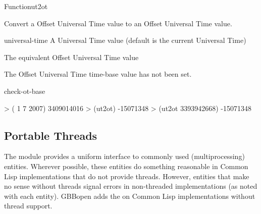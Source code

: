 \documentclass[10pt,twoside,english,pdftex]{article}
\begin{document}
\begin{functiondoc}{Function}{ut2ot}{ 
  \returns{} }
%

\fnsyntax

\fnpurpose Convert a Offset Universal Time value to an Offset Universal 
Time value.

\fnpackage {}

\fnmodule {}

\fnargs
\begin{args}{universal-time}
 A Universal Time value (default is the current
   Universal Time)
\end{args}

\fnreturns The equivalent Offset Universal Time value

\fnerrors The Offset Universal Time time-base value has not been set.

\begin{alsos}{check-ot-base}
\also[ot2ut]
\end{alsos}

\fnexamples
\begin{example}
> ( 1 7 2007)
3409014016
> (ut2ot)
-15071348
> (ut2ot 3393942668)
-15071348
\end{example}

\end{functiondoc}


\T\markright{}%
\T\pagestyle{plain}
\T\clearpage
\W{}
\T\pagestyle{fancy}
\T\thispagestyle{fancybottom}
\T\global\def\fnlastname{ }%

\subsection{Portable Threads}
\label{sec:portablethreads}%

%
%
The  module provides a uniform interface to commonly
used  (multiprocessing) entities.  Wherever possible, these
entities do something reasonable in Common Lisp implementations that do not
provide threads. However, entities that make no sense without threads signal
errors in non-threaded implementations (as noted with each entity). GBBopen
adds the   on Common Lisp
implementations without thread support.
\end{document}
